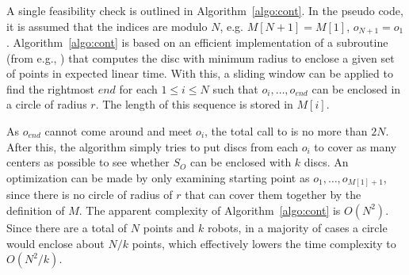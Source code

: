 A single feasibility check is outlined in Algorithm~\ref{algo:cont}.
In the pseudo code, it is assumed that the indices are modulo $N$, e.g. 
$M[N+1] = M[1]$, $o_{N+1} = o_1$. 
%
Algorithm~\ref{algo:cont} is based on an efficient implementation of 
a subroutine \algomed (from e.g., \cite{welzl1991smallest,
Mark1997computation}) that computes the disc with minimum radius to 
enclose a given set of points in expected linear time. With this, a sliding 
window can be applied to find the rightmost $end$ for each $1\leq i\leq 
N$ such that $o_i, \dots, o_{end}$ can be enclosed in a circle of radius 
$r$. The length of this sequence is stored in $M[i]$. 

As $o_{end}$ cannot come around and meet $o_i$, the total call to 
\algomed is no more than $2N$. After this, the algorithm simply tries to put 
discs from each $o_i$ to cover as many centers as possible to see 
whether $S_O$ can be enclosed with $k$ discs. An optimization can be made 
by only examining starting point as $o_1, \dots, o_{M[1]+1}$, since there 
is no circle of radius of $r$ that can cover them together by the 
definition of $M$.
%
The apparent complexity of Algorithm~\ref{algo:cont} is $O(N^2)$. Since 
there are a total of $N$ points and $k$ robots, in a majority 
of cases a circle would enclose about $N/k$ points, which effectively 
lowers the time complexity to $O(N^2/k)$.

